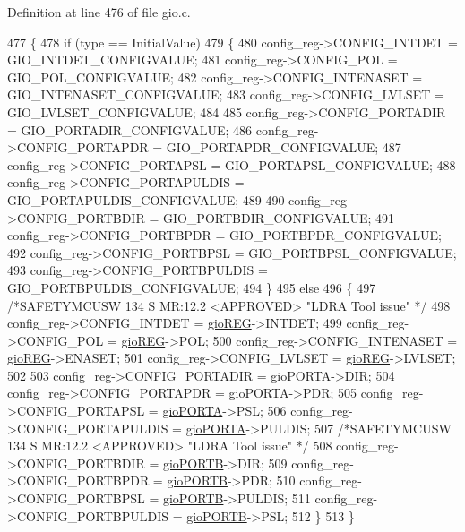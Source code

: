Definition at line 476 of file gio.\+c.


\begin{DoxyCode}
477 \{
478     \textcolor{keywordflow}{if} (type == InitialValue)
479     \{
480         config\_reg->CONFIG\_INTDET    = GIO\_INTDET\_CONFIGVALUE;
481         config\_reg->CONFIG\_POL       = GIO\_POL\_CONFIGVALUE;
482         config\_reg->CONFIG\_INTENASET = GIO\_INTENASET\_CONFIGVALUE;
483         config\_reg->CONFIG\_LVLSET    = GIO\_LVLSET\_CONFIGVALUE;
484 
485         config\_reg->CONFIG\_PORTADIR    = GIO\_PORTADIR\_CONFIGVALUE;
486         config\_reg->CONFIG\_PORTAPDR    = GIO\_PORTAPDR\_CONFIGVALUE;
487         config\_reg->CONFIG\_PORTAPSL    = GIO\_PORTAPSL\_CONFIGVALUE;
488         config\_reg->CONFIG\_PORTAPULDIS = GIO\_PORTAPULDIS\_CONFIGVALUE;
489 
490         config\_reg->CONFIG\_PORTBDIR    = GIO\_PORTBDIR\_CONFIGVALUE;
491         config\_reg->CONFIG\_PORTBPDR    = GIO\_PORTBPDR\_CONFIGVALUE;
492         config\_reg->CONFIG\_PORTBPSL    = GIO\_PORTBPSL\_CONFIGVALUE;
493         config\_reg->CONFIG\_PORTBPULDIS = GIO\_PORTBPULDIS\_CONFIGVALUE;
494     \}
495     \textcolor{keywordflow}{else}
496     \{
497     \textcolor{comment}{/*SAFETYMCUSW 134 S MR:12.2 <APPROVED> "LDRA Tool issue" */}
498         config\_reg->CONFIG\_INTDET    = \mbox{\hyperlink{reg__gio_8h_acf3fc7487b247fa20e47f99b3551b8dd}{gioREG}}->INTDET;
499         config\_reg->CONFIG\_POL       = \mbox{\hyperlink{reg__gio_8h_acf3fc7487b247fa20e47f99b3551b8dd}{gioREG}}->POL;
500         config\_reg->CONFIG\_INTENASET = \mbox{\hyperlink{reg__gio_8h_acf3fc7487b247fa20e47f99b3551b8dd}{gioREG}}->ENASET;
501         config\_reg->CONFIG\_LVLSET    = \mbox{\hyperlink{reg__gio_8h_acf3fc7487b247fa20e47f99b3551b8dd}{gioREG}}->LVLSET;
502 
503         config\_reg->CONFIG\_PORTADIR    = \mbox{\hyperlink{reg__gio_8h_ae20775a37d510c0bd217a9f75c90a574}{gioPORTA}}->DIR;
504         config\_reg->CONFIG\_PORTAPDR    = \mbox{\hyperlink{reg__gio_8h_ae20775a37d510c0bd217a9f75c90a574}{gioPORTA}}->PDR;
505         config\_reg->CONFIG\_PORTAPSL    = \mbox{\hyperlink{reg__gio_8h_ae20775a37d510c0bd217a9f75c90a574}{gioPORTA}}->PSL;
506         config\_reg->CONFIG\_PORTAPULDIS = \mbox{\hyperlink{reg__gio_8h_ae20775a37d510c0bd217a9f75c90a574}{gioPORTA}}->PULDIS;
507     \textcolor{comment}{/*SAFETYMCUSW 134 S MR:12.2 <APPROVED> "LDRA Tool issue" */}
508         config\_reg->CONFIG\_PORTBDIR    = \mbox{\hyperlink{reg__gio_8h_af0da6a4cad272dcfc7922ff5a5fc30cb}{gioPORTB}}->DIR;
509         config\_reg->CONFIG\_PORTBPDR    = \mbox{\hyperlink{reg__gio_8h_af0da6a4cad272dcfc7922ff5a5fc30cb}{gioPORTB}}->PDR;
510         config\_reg->CONFIG\_PORTBPSL    = \mbox{\hyperlink{reg__gio_8h_af0da6a4cad272dcfc7922ff5a5fc30cb}{gioPORTB}}->PULDIS;
511         config\_reg->CONFIG\_PORTBPULDIS = \mbox{\hyperlink{reg__gio_8h_af0da6a4cad272dcfc7922ff5a5fc30cb}{gioPORTB}}->PSL;
512     \}
513 \}
\end{DoxyCode}
\mbox{\label{group__GIO_ga84c1081ad04ee2a9ce8f4cc3a446cfaf}} 
